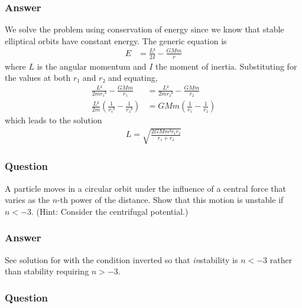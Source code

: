 \subsubsection{Answer}
We solve the problem using conservation of energy since we know that stable
elliptical orbits have constant energy. The generic equation is
\begin{align*}
	E &= \frac{L²}{2I} - \frac{GMm}{r}
\end{align*}
where $L$ is the angular momentum and $I$ the moment of inertia. Substituting
for the values at both $r₁$ and $r₂$ and equating,
\begin{align*}
	\frac{L²}{2m{r₁}²} - \frac{GMm}{r₁} &= \frac{L²}{2m{r₂}²} - \frac{GMm}{r₂}\\
	\frac{L²}{2m}(\frac{1}{{r₁}²} - \frac{1}{{r₂}²}) &=
		GMm(\frac{1}{r₁} - \frac{1}{r₂})
\end{align*}
which leads to the solution
\begin{align}
	\boxed{
	L = \sqrt{ \frac{2GMm² r₁ r₂}{r₁ + r₂} }
	}
\end{align}

\subsubsection{Question}

A particle moves in a circular orbit under the influence of a central force
that varies as the $n$-th power of the distance. Show that this motion is
unstable if $n < -3$. (Hint: Consider the centrifugal potential.)

\subsubsection{Answer}
See solution for  with the condition inverted so
that \emph{in}stability is $n < -3$ rather than stability requiring $n > -3$.

\subsubsection{Question}

